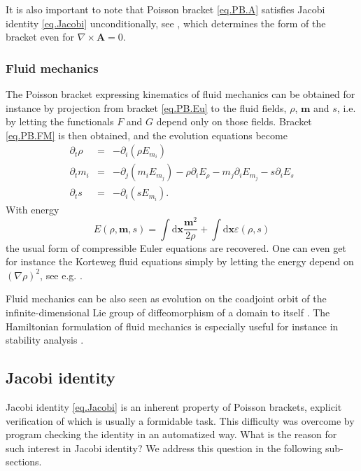 \documentclass[
10pt, %
a4paper, %
oneside, %
headinclude,footinclude, %
BCOR5mm, %
]{scrartcl}
\newcommand{\xx}{\mathbf{x}}
\newcommand{\dx}{\mathrm{d}\xx}
\newcommand{\mm}{\mathbf{m}}
\newcommand{\eps}{\varepsilon}
\renewcommand{\AA}{\mathbf{A}}
\newcommand{\Ffunc}{F}
\newcommand{\Gfunc}{G}
\begin{document}
It is also important to note that Poisson bracket \eqref{eq.PB.A} satisfies 
Jacobi identity \eqref{eq.Jacobi} unconditionally, see \cite{SHTC-GENERIC}, 
which determines the form of the bracket even for $\nabla\times\AA = 0$.

\subsubsection{Fluid mechanics}
The Poisson bracket expressing kinematics of fluid mechanics can be obtained 
for instance by projection from bracket \eqref{eq.PB.Eu} to the fluid fields, 
$\rho$, $\mm$ and $s$, i.e. by letting the functionals $\Ffunc$ and $\Gfunc$ 
depend only on those fields. Bracket \eqref{eq.PB.FM} is then obtained, and the 
evolution equations become
\begin{subequations}\label{eq.evo.FM}
	\begin{eqnarray}
	\partial_t \rho &=& -\partial_i(\rho E_{m_i})\\
	\partial_t m_i &=& -\partial_j(m_i E_{m_j})-\rho\partial_i E_\rho - m_j \partial_i E_{m_j} -s \partial_i E_s\\
	\partial_t s &=& -\partial_i(s E_{m_i}).
	\end{eqnarray}
\end{subequations}
With energy
\begin{equation}\label{eq.ene.FM}
    E(\rho,\mm,s)=\int\dx \frac{\mm^2}{2\rho} + \int\dx \eps(\rho,s)
\end{equation}
the usual form of compressible Euler equations are recovered. 
One can even get for instance the Korteweg fluid equations simply by letting 
the energy depend on $(\nabla\rho)^2$, see e.g. \cite{PKG}. 

Fluid mechanics can be also seen as evolution on the coadjoint orbit of the infinite-dimensional 
Lie group of diffeomorphism of a domain to itself \cite{marsden1984semidirect,Arnold}. The Hamiltonian formulation of fluid mechanics is especially useful for instance in stability analysis \cite{Abarbanel-stability}.

\subsection{Jacobi identity}\label{sec.Jacobi}
Jacobi identity \eqref{eq.Jacobi} is an inherent property of Poisson brackets, 
explicit verification of which is usually a formidable task. This difficulty 
was overcome by program \cite{kroeger2010} checking the identity in an 
automatized way. What is the reason for such interest in Jacobi identity? We 
address this question in the following sub-sections.
\end{document}
